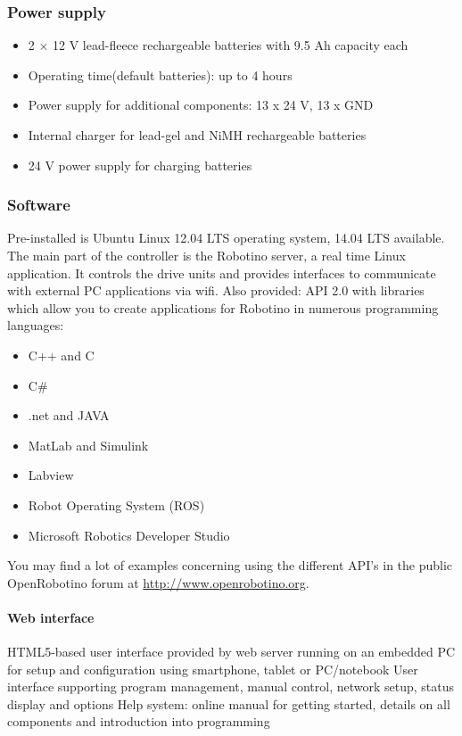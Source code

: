 \documentclass[12pt,twoside]{article}
\begin{document}
\begin{appendix}
\subsubsection{Power supply}
\begin{itemize}
\item 2 $\times$ 12 V lead-fleece rechargeable batteries with 9.5 Ah
  capacity each
\item Operating time(default batteries): up to 4 hours
\item Power supply for additional components: 13 x 24 V, 13 x GND
\item Internal charger for lead-gel and NiMH rechargeable batteries
\item 24 V power supply for charging batteries
\end{itemize}

\subsubsection{Software}
Pre-installed is Ubuntu Linux 12.04 LTS operating system, 14.04 LTS available.
The main part of the controller is the Robotino server, a real time Linux
application. It controls the drive units and provides interfaces to
communicate with external PC applications via wifi. Also provided: API
2.0 with libraries which allow you to create applications for Robotino
in numerous programming languages:

\begin{itemize}
\item C++ and C 
\item C\# 
\item .net and JAVA 
\item MatLab and Simulink
\item Labview
\item Robot Operating System (ROS)
\item Microsoft Robotics Developer Studio
\end{itemize}

You may find a lot of examples concerning using the different API's in
the public OpenRobotino forum at \url{http://www.openrobotino.org}.

\paragraph{Web interface}
HTML5-based user interface provided by web server running on an embedded
PC for setup and configuration using smartphone, tablet or PC/notebook
User interface supporting program management, manual control, network
setup, status display and options Help system: online manual for
getting started, details on all components and introduction into
programming


\end{appendix}
\end{document}
